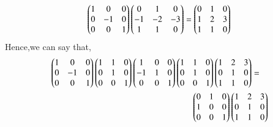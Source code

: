 \documentclass[journal,12pt,twocolumn]{IEEEtran}
\begin{document}
 \begin{align}
   \begin{pmatrix}1&0&0\\0&-1&0\\0&0&1\end{pmatrix} \begin{pmatrix}0&1&0\\-1&-2&-3\\1&1&0\end{pmatrix}=
\begin{pmatrix}0&1&0\\1&2&3\\1&1&0\end{pmatrix}
 \end{align}
 Hence,we can say that,
 \begin{align}
 \begin{multlined}
  \myvec{1&0&0\\0&-1&0\\0&0&1} \myvec{1&1&0\\0&1&0\\0&0&1}\myvec{1&0&0\\-1&1&0\\0&0&1}\myvec{1&1&0\\0&1&0\\0&0&1}\myvec{1&2&3\\0&1&0\\1&1&0}=\\ \myvec{0&1&0\\1&0&0\\0&0&1}\myvec{1&2&3\\0&1&0\\1&1&0}
     \end{multlined}
 \end{align}
  
\end{document}
